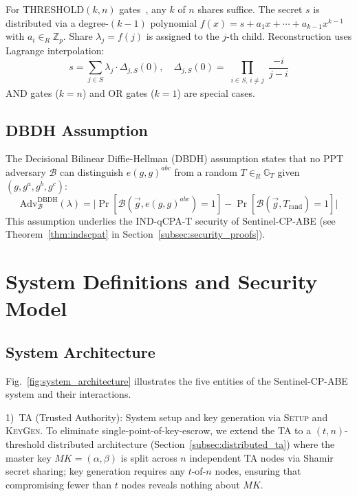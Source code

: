 \documentclass[lettersize,journal]{IEEEtran}
\begin{document}
For THRESHOLD$(k,n)$ gates~\cite{Chattopadhyay2024}, any $k$ of $n$
shares suffice. The secret $s$ is distributed via a degree-$(k-1)$
polynomial $f(x) = s + a_1 x + \cdots + a_{k-1} x^{k-1}$ with
$a_i \in_R \mathbb{Z}_p$. Share $\lambda_j = f(j)$ is assigned to
the $j$-th child. Reconstruction uses Lagrange interpolation:
\begin{equation}
    s = \sum_{j \in S} \lambda_j \cdot \Delta_{j,S}(0), \quad
    \Delta_{j,S}(0) = \prod_{\substack{i \in S, \, i \neq j}}
    \frac{-i}{j - i}
    \label{eq:lagrange}
\end{equation}
AND gates ($k=n$) and OR gates ($k=1$) are special cases.

\subsection{DBDH Assumption}
\label{subsec:dbdh}

The Decisional Bilinear Diffie-Hellman (DBDH) assumption states that
no PPT adversary $\mathcal{B}$ can distinguish $e(g,g)^{abc}$ from
a random $T \in_R \mathbb{G}_T$ given $(g, g^a, g^b, g^c)$:
\begin{equation}
    \text{Adv}_{\mathcal{B}}^{\text{DBDH}}(\lambda)
    = \bigl|\Pr[\mathcal{B}(\vec{g}, e(g,g)^{abc})=1]
    - \Pr[\mathcal{B}(\vec{g}, T_{\text{rand}})=1]\bigr|
    \label{eq:dbdh}
\end{equation}
This assumption underlies the IND-qCPA-T security of Sentinel-CP-ABE
(see Theorem~\ref{thm:indscpat} in Section~\ref{subsec:security_proofs}).

\section{System Definitions and Security Model}
\label{sec:system}


\subsection{System Architecture}
\label{subsec:architecture}

Fig.~\ref{fig:system_architecture} illustrates the five entities of the
Sentinel-CP-ABE system and their interactions.

1)~TA (Trusted Authority): System setup and key generation via
\textsc{Setup} and \textsc{KeyGen}. To eliminate single-point-of-key-escrow,
we extend the TA to a $(t,n)$-threshold distributed architecture
(Section~\ref{subsec:distributed_ta}) where the master key $MK=(\alpha,\beta)$
is split across $n$ independent TA nodes via Shamir secret sharing;
key generation requires any $t$-of-$n$ nodes, ensuring that compromising
fewer than $t$ nodes reveals nothing about $MK$.
\end{document}
